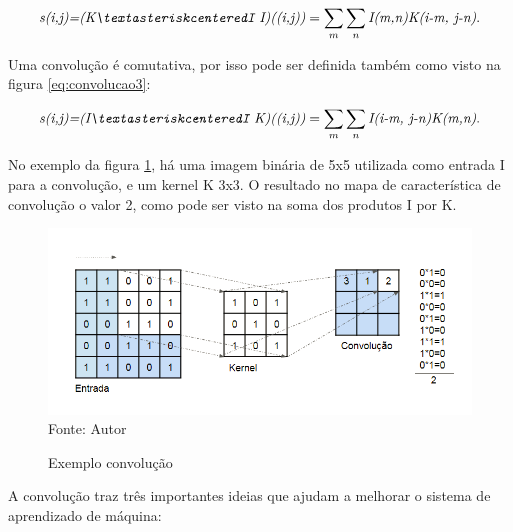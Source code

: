 \documentclass[
	12pt,				%
    oneside,			%
	a4paper,			%
	english,			%
	french,				%
	spanish,			%
	brazil,				%
	]{abntex2}
\begin{document}
\begin{equation}
\centering
    \textit{s(i,j)=(K\textasteriskcenteredI I)((i,j))} = \sum_{m} \sum_{n} \textit{I(m,n)K(i-m, j-n)} .
    \label{eq:convolucao2}
\end{equation}

Uma convolução é comutativa, por isso pode ser definida também como visto na figura \ref{eq:convolucao3}:

\begin{equation}
\centering
    \textit{s(i,j)=(I\textasteriskcenteredI K)((i,j))} = \sum_{m} \sum_{n} \textit{I(i-m, j-n)K(m,n)} .
    \label{eq:convolucao3}
\end{equation}


No exemplo da figura \ref{fig:convolução}, há uma imagem binária de 5x5 utilizada como entrada I para a convolução, e um kernel K 3x3. O resultado no mapa de característica de convolução o valor 2, como pode ser visto na soma dos produtos I por K.

\begin{figure}[H]
    \centering
    \caption{Exemplo convolução}
    \includegraphics[scale=0.65]{convolucao1}\\
    Fonte: Autor\hfill
    \label{fig:convolução}
\end{figure}

A convolução traz três importantes ideias que ajudam a melhorar o sistema de aprendizado de máquina:
\end{document}
